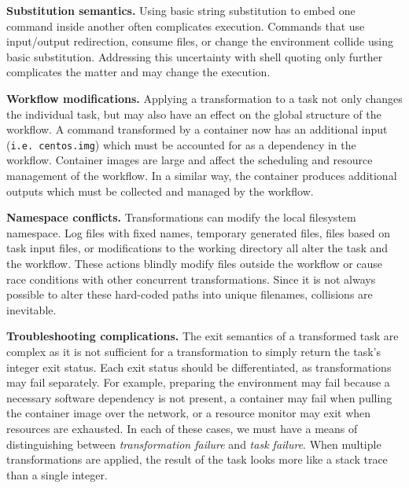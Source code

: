 \documentclass[conference]{IEEEtran}
\begin{document}
    {\bf Substitution semantics.} 
    Using basic string substitution to embed one command 
    inside another often complicates execution.  
    Commands that use 
    input/output redirection,
    consume files,
    or change the environment 
    collide using basic substitution.
    Addressing this uncertainty with shell quoting only 
    further complicates the matter and may
    change the execution.

        
    {\bf Workflow modifications.}
    Applying a transformation to a task not 
    only changes the individual task, 
    but may also have an effect on the 
    global structure of the workflow.  
    A command transformed by a container 
    now has an additional input ({\tt i.e. centos.img})
    which must be accounted for as a 
    dependency in the workflow.
    Container images are large and affect the 
    scheduling and resource management of the workflow.  
    In a similar way, the container produces additional 
    outputs which must be collected and managed by the
    workflow.
    
    {\bf Namespace conflicts.}
    Transformations can modify 
    the local filesystem namespace.
    Log files with fixed names, 
    temporary generated files, 
    files based on task input files, 
    or modifications to the working directory 
    all alter the task and the workflow.
    These actions blindly modify files 
    outside the workflow or cause 
    race conditions with other concurrent transformations.
    Since it is not always possible to alter these
    hard-coded paths into unique filenames,
    collisions are inevitable.
    
    {\bf Troubleshooting complications.}
    The exit semantics of a transformed task are complex 
    as it is not sufficient for a transformation to simply
    return the task's integer exit status.
    Each exit status should be differentiated,
    as transformations may fail separately.
    For example, preparing the environment may fail because a
    necessary software dependency is not present,
    a container may fail when pulling the container image over the network, or 
    a resource monitor may exit when resources are exhausted.
    In each of these cases, we must have a means of distinguishing
    between \emph{transformation failure} and \emph{task failure}.
    When multiple transformations are applied, the result of the
    task looks more like a stack trace than a single integer.
\end{document}
